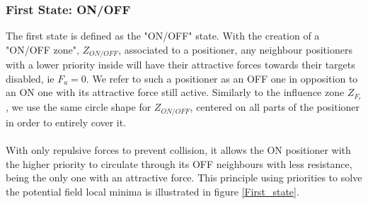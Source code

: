 \documentclass[]{spie}  %
\begin{document}
	\subsubsection{First State: ON/OFF}
	\label{first_state_chap}
	The first state  is defined as the "ON/OFF" state. With the creation of a "ON/OFF zone", $Z_{ON/OFF}$, associated to a positioner, any neighbour positioners with a lower priority inside will have their attractive forces towards their targets disabled, ie $F_a = 0$. We refer to such a positioner as an OFF one in opposition to an ON one with its attractive force still active.
	Similarly to the influence zone $Z_{F_{r}}$, we use the same circle shape for $Z_{ON/OFF}$, centered on all parts of the positioner in order to entirely cover it.\\\\
	 With only repulsive forces to prevent collision, it allows the ON positioner with the higher priority to circulate through its OFF neighbours with less resistance, being the only one with an attractive force. This principle using priorities to solve the potential field local minima is illustrated in figure \ref{First_state}. 	
\end{document}
